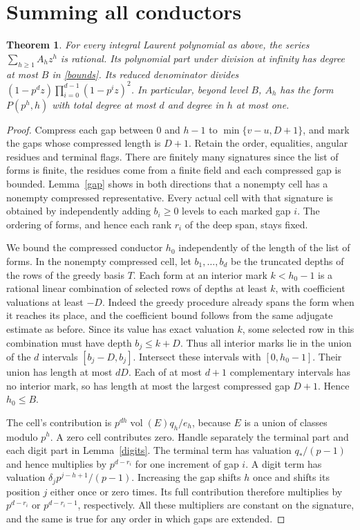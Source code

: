 \documentclass[11pt]{article}
\newtheorem{theorem}{Theorem}[section]
\newcommand{\vol}{\operatorname{vol}}
\begin{document}
\section{Summing all conductors}
\begin{theorem}\label{series}
For every integral Laurent polynomial as above, the series $\sum_{h\ge1} A_hz^h$ is rational. Its polynomial part under division at infinity has degree at most $B$ in \eqref{bounds}. Its reduced denominator divides $(1-p^dz)\prod_{i=0}^{d-1}(1-p^iz)^2$. In particular, beyond level $B$, $A_h$ has the form $P(p^h,h)$ with total degree at most $d$ and degree in $h$ at most one.
\end{theorem}
\begin{proof}
Compress each gap between $0$ and $h-1$ to $\min\{v-u,D+1\}$, and mark the gaps whose compressed length is $D+1$. Retain the order, equalities, angular residues and terminal flags. There are finitely many signatures since the list of forms is finite, the residues come from a finite field and each compressed gap is bounded. Lemma~\ref{gap} shows in both directions that a nonempty cell has a nonempty compressed representative. Every actual cell with that signature is obtained by independently adding $b_i\ge0$ levels to each marked gap $i$. The ordering of forms, and hence each rank $r_i$ of the deep span, stays fixed.

We bound the compressed conductor $h_0$ independently of the length of the list of forms. In the nonempty compressed cell, let $b_1,\ldots,b_d$ be the truncated depths of the rows of the greedy basis $T$. Each form at an interior mark $k<h_0-1$ is a rational linear combination of selected rows of depths at least $k$, with coefficient valuations at least $-D$. Indeed the greedy procedure already spans the form when it reaches its place, and the coefficient bound follows from the same adjugate estimate as before. Since its value has exact valuation $k$, some selected row in this combination must have depth $b_j\le k+D$. Thus all interior marks lie in the union of the $d$ intervals $[b_j-D,b_j]$. Intersect these intervals with $[0,h_0-1]$. Their union has length at most $dD$. Each of at most $d+1$ complementary intervals has no interior mark, so has length at most the largest compressed gap $D+1$. Hence $h_0\le B$.

The cell's contribution is $p^{dh}\vol(E)q_h/e_h$, because $E$ is a union of classes modulo $p^h$. A zero cell contributes zero. Handle separately the terminal part and each digit part in Lemma~\ref{digits}. The terminal term has valuation $q_* /(p-1)$ and hence multiplies by $p^{d-r_i}$ for one increment of gap $i$. A digit term has valuation $\delta_jp^{j-h+1}/(p-1)$. Increasing the gap shifts $h$ once and shifts its position $j$ either once or zero times. Its full contribution therefore multiplies by $p^{d-r_i}$ or $p^{d-r_i-1}$, respectively. All these multipliers are constant on the signature, and the same is true for any order in which gaps are extended.


\end{proof}
\end{document}
